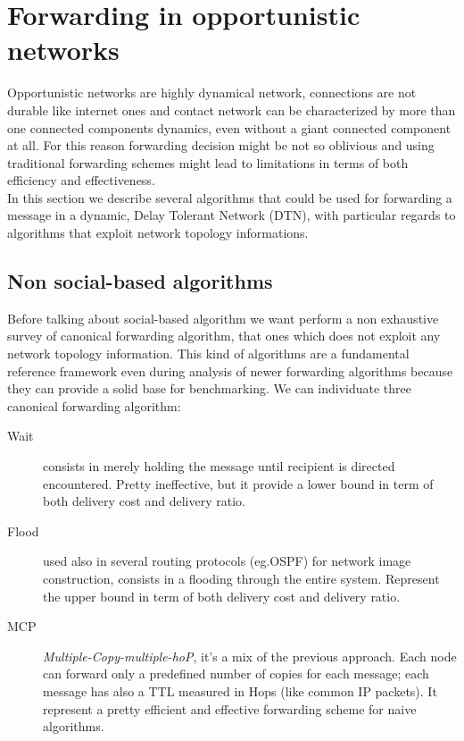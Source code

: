 \section{Forwarding in opportunistic networks}
\label{forwarding}

Opportunistic networks are highly dynamical network, connections are not durable like internet ones and contact network can be characterized by more than one connected components dynamics, even without a giant connected component at all. For this reason forwarding decision might be not so oblivious and using traditional forwarding schemes might lead to limitations in terms of both efficiency and effectiveness.\\
In this section we describe several algorithms that could be used for forwarding a message in a dynamic, Delay Tolerant Network (DTN), with particular regards to algorithms that exploit network topology informations.

\subsection{Non social-based algorithms}
\label{f_non_social}
Before talking about social-based algorithm we want perform a non exhaustive survey of canonical forwarding algorithm, that ones which does not exploit any network topology information. This kind of algorithms are a fundamental reference framework even during analysis of newer forwarding algorithms because they can provide a solid base for benchmarking. We can individuate three canonical forwarding algorithm:

\begin{description}
\item[Wait] consists in merely holding the message until recipient is directed encountered. Pretty ineffective, but it provide a lower bound in term of both delivery cost and delivery ratio.
\item[Flood] used also in several routing protocols (eg.OSPF) for network image construction, consists in a flooding through the entire system. Represent the upper bound in term of both delivery cost and delivery ratio.
\item[MCP] \emph{Multiple-Copy-multiple-hoP}, it's a mix of the previous approach. Each node can forward only a predefined number of copies for each message; each message has also a TTL measured in Hops (like common IP packets). It represent a pretty efficient and effective forwarding scheme for naive algorithms.\end{description} 

